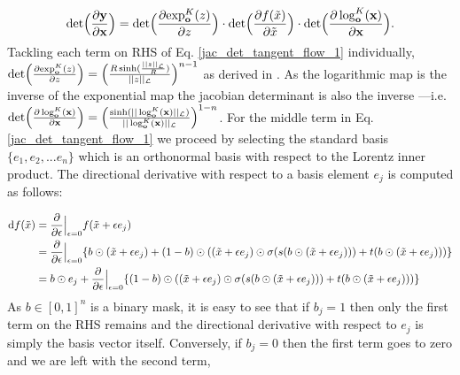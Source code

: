 \begin{equation}
    \textnormal{det}\Big (\frac{\partial \textbf{y}}{\partial \textbf{x}}\Big) =  \textnormal{det}\Big (\frac{\partial \textnormal{exp}^K_{\textbf{o}}(z)}{\partial z}\Big) \cdot \textnormal{det}\Big (\frac{\partial f(\tilde{x})}{\partial \tilde{x}}\Big) \cdot  \textnormal{det}\Big (\frac{\partial \log^K_{\textbf{o}}(\textbf{x})}{\partial \textbf{x}}\Big)
    \label{jac_det_tangent_flow_1}.
\end{equation}
Tackling each term on RHS of Eq. \ref{jac_det_tangent_flow_1} individually, $ \textnormal{det}\Big (\frac{\partial \textnormal{exp}^K_{\textbf{o}}(z)}{\partial z}\Big) = \Big(\frac{R\sinh(\frac{||z||_{\mathcal{L}}}{R})}{||z||_{\mathcal{L}}}\Big)^{n-1}$ as derived in \cite{nagano2019wrapped}. As the logarithmic map is the inverse of the exponential map the jacobian determinant is also the inverse ---i.e.  $\textnormal{det}\Big (\frac{\partial \log^K_{\textbf{o}}(\textbf{x})}{\partial \textbf{x}}\Big) = \Big(\frac{\sinh(||\log^K_{\textbf{o}}(\textbf{x})||_{\mathcal{L}})}{||\log^K_{\textbf{o}}(\textbf{x})||_{\mathcal{L}}}\Big)^{1-n}$. For the middle term in Eq. \ref{jac_det_tangent_flow_1} we proceed by selecting the standard basis $\{e_1, e_2, ... e_n\}$ which is an orthonormal basis  with respect to the Lorentz inner product. The directional derivative with respect to a basis element $e_j$ is computed as follows:

\begin{align*}
    \textnormal{d}f(\tilde{x}) &= \frac{\partial}{\partial \epsilon} \Big |_{\epsilon=0} f(\tilde{x} + \epsilon e_j)\\
    & = \frac{\partial}{\partial \epsilon} \Big |_{\epsilon=0} \{b \odot (\tilde{x} + \epsilon e_j) + (1 - b)\odot((\tilde{x} + \epsilon e_j) \odot \sigma(s(b \odot (\tilde{x} + \epsilon e_j))) + t(b \odot (\tilde{x} + \epsilon e_j)))\} \\
    &= b \odot  e_j + \frac{\partial}{\partial \epsilon} \Big |_{\epsilon=0}\{ (1 - b)\odot((\tilde{x} + \epsilon e_j) \odot \sigma(s(b \odot (\tilde{x} + \epsilon e_j))) + t(b \odot (\tilde{x} + \epsilon e_j)))\} \\
\end{align*}
As $b \in [0,1]^n$ is a binary mask, it is easy to see that if $b_j =1$ then only the first term on the RHS remains and the directional derivative with respect to $e_j$ is simply the basis vector itself. Conversely, if $b_j =0$ then the first term goes to zero and we are left with the second term,


